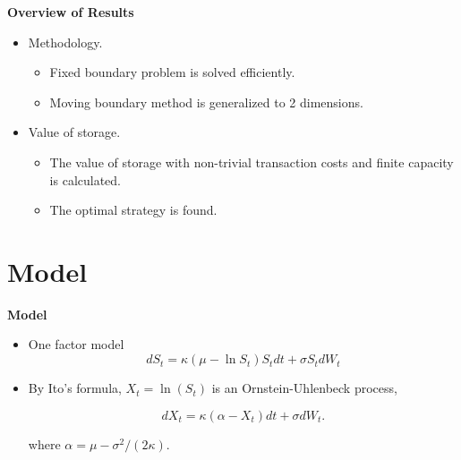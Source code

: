 \documentclass{beamer}
\begin{document}
\begin{frame}
{\bf Overview of Results}
\begin{itemize}
\item Methodology.
\begin{itemize}
\item Fixed boundary problem is solved efficiently. 
  \item Moving boundary method is generalized to 2 dimensions.
\end{itemize}

\item Value of storage.

\begin{itemize}
  \item The value of storage with non-trivial transaction costs and finite capacity is calculated.
  \item  The optimal strategy is found.
\end{itemize}

  
\end{itemize}

\end{frame}


\section{Model}
\begin{frame}
{\bf Model}
\begin{itemize}
  \item One factor model
\begin{equation*}
  dS_t = \kappa ( \mu - \ln S_t)S_t dt + \sigma S_t dW_t
\end{equation*}
\item By Ito's formula, $X_t = \ln(S_t)$ is an Ornstein-Uhlenbeck process,

\begin{equation*}
  dX_t = \kappa ( \alpha - X_t) dt + \sigma dW_t.
\end{equation*}

where $\alpha  = \mu - \sigma^2/(2\kappa)$.
\end{itemize}

\end{frame}
\end{document}
